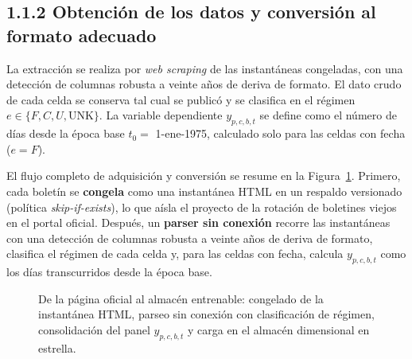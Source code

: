 \documentclass[12pt,letterpaper]{report}
\begin{document}
\subsection{1.1.2 Obtención de los datos y conversión al formato adecuado}

La extracción se realiza por \textit{web scraping} de las instantáneas congeladas,
con una detección de columnas robusta a veinte años de deriva de formato. El dato
crudo de cada celda se conserva tal cual se publicó y se clasifica en el régimen
$e \in \{F, C, U, \text{UNK}\}$. La variable dependiente $y_{p,c,b,t}$ se define
como el número de días desde la época base $t_0 = $ 1-ene-1975, calculado solo para
las celdas con fecha ($e=F$).

El flujo completo de adquisición y conversión se resume en la
Figura~\ref{fig:pipeline_datos}. Primero, cada boletín se \textbf{congela} como una instantánea
HTML en un respaldo versionado (política \textit{skip-if-exists}), lo que aísla el proyecto de la
rotación de boletines viejos en el portal oficial. Después, un \textbf{parser sin conexión}
recorre las instantáneas con una detección de columnas robusta a veinte años de deriva de
formato, clasifica el régimen de cada celda y, para las celdas con fecha, calcula
$y_{p,c,b,t}$ como los días transcurridos desde la época base.

\begin{figure}[H]
\centering
{}
\caption[Conversión de los datos]{De la página oficial al almacén entrenable: congelado de la
instantánea HTML, parseo sin conexión con clasificación de régimen, consolidación del panel
$y_{p,c,b,t}$ y carga en el almacén dimensional en estrella.}
\label{fig:pipeline_datos}
\end{figure}
\end{document}
